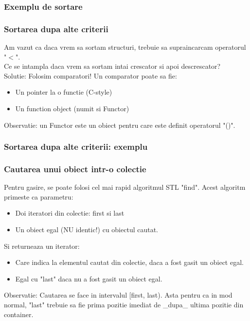 \documentclass{beamer}
\begin{document}
  \begin{frame}
  \frametitle{Exemplu de sortare}
  
  \end{frame}

  \begin{frame}
  \frametitle{Sortarea dupa alte criterii}
  Am vazut ca daca vrem sa sortam structuri, trebuie sa supraincarcam operatorul "$<$". 
  \vspace{0.01cm}
  \pause
  \\Ce se intampla daca vrem sa sortam intai crescator si apoi descrescator?
  \pause
  \vspace{0.01cm}
  \\Solutie: Folosim comparatori! Un comparator poate sa fie:
  \pause
  \begin{itemize}
  \item Un pointer la o functie (C-style)
  \item Un function object (numit si Functor)
  \end{itemize}
  \pause
  Observatie: un Functor este un obiect pentru care este definit operatorul "()".
  \end{frame}

  \begin{frame}
  \frametitle{Sortarea dupa alte criterii: exemplu}
  
  \end{frame}

  \begin{frame}
  \frametitle{Cautarea unui obiect intr-o colectie}
  Pentru gasire, se poate folosi cel mai rapid algoritmul STL "find". Acest algoritm primeste ca parametru:
  \begin{itemize}
  \pause \item Doi iteratori din colectie: first si last
  \pause \item Un obiect egal (NU identic!) cu obiectul cautat.
  \end{itemize}
  \pause
  Si returneaza un iterator:
  \begin{itemize}
  \pause \item Care indica la elementul cautat din colectie, daca a fost gasit un obiect egal.
  \pause \item Egal cu "last" daca nu a fost gasit un obiect egal.
  \end{itemize}
  \pause Observatie: Cautarea se face in intervalul [first, last). Asta pentru ca in mod normal, "last" trebuie sa fie prima pozitie imediat de \_dupa\_ ultima pozitie din container.
  \end{frame}
\end{document}
